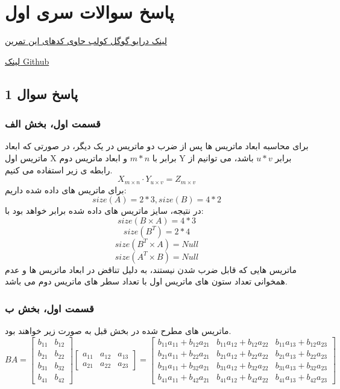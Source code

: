 
\chapter{پاسخ سوالات سری اول}

\href{https://drive.google.com/drive/folders/1BMXUcHZQBMV6n8P9XX5LD0nV40Ff3FDP?usp=drive_link}{لینک درایو گوگل کولب حاوی کدهای این تمرین}

\href{https://github.com/Alireza2001Amiri/KNTU-ML}{لینک Github}

\section{ پاسخ سوال 1}
\subsection{قسمت اول، بخش الف}
برای محاسبه ابعاد ماتریس ها پس از ضرب دو ماتریس در یک دیگر، در صورتی که ابعاد ماتریس اول X برابر با $m * n$ و ابعاد ماتریس دوم Y برابر $u * v$ باشد، می توانیم از رابطه ی زیر استفاده می کنیم. 
\[
X_{m \times n} \cdot Y_{u \times v} = Z_{m \times v}
\]
برای ماتریس های داده شده داریم:
\[
size(A) = 2*3 , size(B) = 4*2
\]
در نتیجه، سایز ماتریس های داده شده برابر خواهد بود با:
\[
size(B \times A) = 4*3 
\]
\[
size(B^{T}) = 2*4 
\]
\[
size(B^{T} \times A) = Null 
\]
\[
size(A^{T} \times B) = Null 
\]
ماتریس هایی که قابل ضرب شدن نیستند، به دلیل تناقض در ابعاد ماتریس ها و عدم همخوانی تعداد ستون های ماتریس اول با تعداد سطر های ماتریس دوم می باشد.

\subsection{قسمت اول، بخش ب}
ماتریس های مطرح شده در بخش قبل به صورت زیر خواهند بود.
\[
BA =
\begin{bmatrix}
	b_{11} & b_{12} \\
	b_{21} & b_{22} \\
	b_{31} & b_{32} \\
	b_{41} & b_{42}
\end{bmatrix}
\begin{bmatrix}
	a_{11} & a_{12} & a_{13} \\
	a_{21} & a_{22} & a_{23}
\end{bmatrix}
=
\begin{bmatrix}
	b_{11} a_{11} + b_{12} a_{21} & b_{11} a_{12} + b_{12} a_{22} & b_{11} a_{13} + b_{12} a_{23} \\
	b_{21} a_{11} + b_{22} a_{21} & b_{21} a_{12} + b_{22} a_{22} & b_{21} a_{13} + b_{22} a_{23} \\
	b_{31} a_{11} + b_{32} a_{21} & b_{31} a_{12} + b_{32} a_{22} & b_{31} a_{13} + b_{32} a_{23} \\
	b_{41} a_{11} + b_{42} a_{21} & b_{41} a_{12} + b_{42} a_{22} & b_{41} a_{13} + b_{42} a_{23}
\end{bmatrix}
\]

